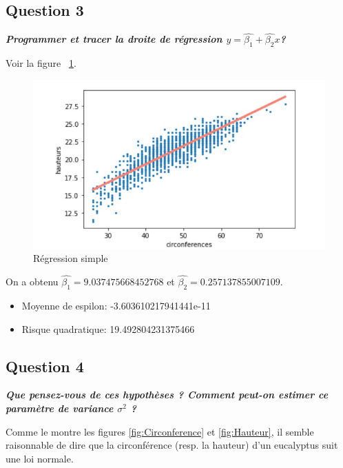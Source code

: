 \documentclass[pdflatex]{article}
\theoremstyle{definition}
\newcommand{\quest}[1]{\textbf{\textit{#1}} \vspace{3mm}}
\begin{document}
\subsection*{Question 3}
\quest{Programmer et tracer la droite de r\'egression $y = \hat{\beta_1} + \hat{\beta_2}x$?}

Voir la figure ~\ref{fig:regression simple}.
\begin{figure}
	\includegraphics[scale=1]{regression_simple.jpg}
    \caption{R\'egression simple}
    \label{fig:regression simple}
\end{figure}

On a obtenu $\hat{\beta_1} =  9.037475668452768$  et $\hat{\beta_2} = 0.257137855007109$.

\begin{itemize}
    \item Moyenne de espilon: -3.603610217941441e-11
    \item Risque quadratique: 19.492804231375466
\end{itemize}
    
\subsection*{Question 4}
\quest{Que pensez-vous de ces hypoth\`eses ? Comment peut-on estimer ce param\`etre de variance $\sigma^2$ ?}

Comme le montre les figures \ref{fig:Circonference} et \ref{fig:Hauteur}, il semble raisonnable de dire que la circonf\'erence (resp. la hauteur) d'un eucalyptus suit une loi normale. 
\end{document}
